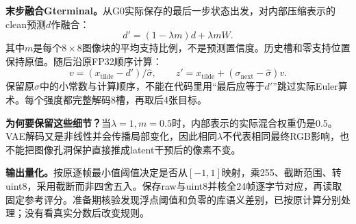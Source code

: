 \documentclass[UTF8,10pt,a4paper]{ctexart}
\begin{document}
\textbf{末步融合Gterminal。}从G0实际保存的最后一步状态出发，对内部压缩表示的clean预测$d$作融合：
\[d'=(1-\lambda m)d+\lambda mW.\]
其中$m$是每个$8\times8$图像块的平均支持比例，不是预测置信度。历史槽和零支持位置保持原值。随后沿原FP32顺序计算：
\[v=(x_{\mathrm{tilde}}-d')/\widehat\sigma,\qquad
z'=x_{\mathrm{tilde}}+(\sigma_{\mathrm{next}}-\widehat\sigma)v.\]
保留原$\widehat\sigma$中的小常数与计算顺序，不能在代码里用“最后应等于$d'$”跳过实际Euler算术。每个强度都完整解码8槽，再取后4张目标。

\textbf{为何要保留这些细节？}当$\lambda=1,m=0.5$时，内部表示的实际混合权重仍是0.5。VAE解码又是非线性并会传播局部变化，因此相同$\lambda$不代表相同最终RGB影响，也不能把图像孔洞保护直接推成latent干预后的像素不变。

\textbf{输出量化。}按原逐帧最小值阈值决定是否从$[-1,1]$映射，乘255、截断范围、转uint8，采用截断而非四舍五入。保存raw与uint8并核全24帧逐字节对应，再读取固定参考评分。准备期核验发现浮点阈值和负零的库语义差别，已按原计算分别处理；没有看真实分数后改变规则。

\clearpage
\end{document}
